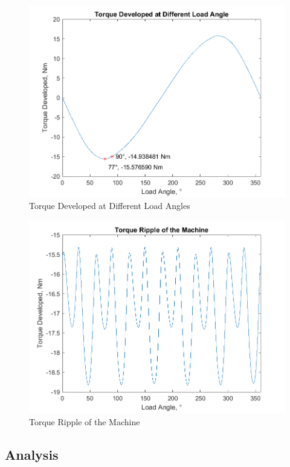 \documentclass[12pt]{article}
\begin{document}
\begin{figure}[H]
    \centering
    \includegraphics[width=1\linewidth]{img/task_3.png}
    \caption{Torque Developed at Different Load Angles}
    \label{fig:task-3}
\end{figure}

\begin{figure}[H]
    \centering
    \includegraphics[width=1\linewidth]{img/task_3_ripple.png}
    \caption{Torque Ripple of the Machine}
    \label{fig:task-3-ripple}
\end{figure}

\subsection{Analysis}
\end{document}
